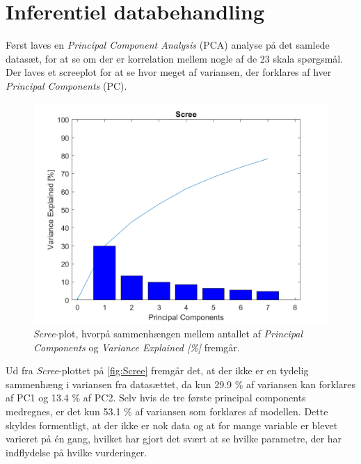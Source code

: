 \section{Inferentiel databehandling}
\label{sec:inferentiel}
%
Først laves en \textit{Principal Component Analysis} (PCA) analyse på det samlede datasæt, for at se om der er korrelation mellem nogle af de 23 skala spørgsmål. Der laves et screeplot for at se hvor meget af variansen, der forklares af hver \textit{Principal Components} (PC).

\begin{figure}[H]
\centering
\includegraphics[width=\textwidth]{Figure/DatabehandlingSkalaer/PCAfigures/Scree.png}
\caption{\textit{Scree}-plot, hvorpå sammenhængen mellem antallet af \textit{Principal Components} og \textit{Variance Explained [\%]} fremgår.}
\label{fig:Scree}
\end{figure}
\noindent
%
Ud fra \textit{Scree}-plottet på \autoref{fig:Scree} fremgår det, at der ikke er en tydelig sammenhæng i variansen fra datasættet, da kun 29.9 \% af variansen kan forklares af PC1 og 13.4 \% af PC2. Selv hvis de tre første principal components medregnes, er det kun 53.1 \% af variansen som forklares af modellen. Dette skyldes formentligt, at der ikke er nok data og at for mange variable er blevet varieret på én gang, hvilket har gjort det svært at se hvilke parametre, der har indflydelse på hvilke vurderinger.

